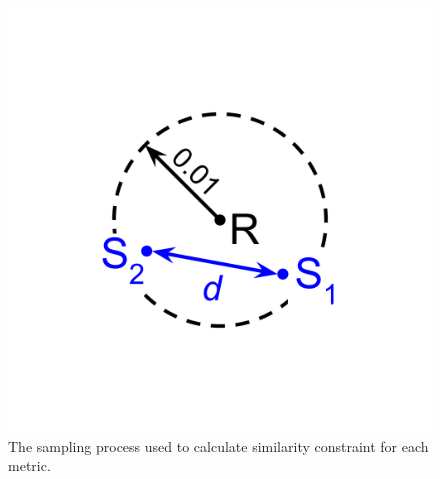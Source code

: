 \begin{figure}[!htbp]
\begin{center}

\begin{minipage}{0.45\linewidth}
\includegraphics[width=\linewidth]{img/dimensionality-statistic}
\end{minipage}
\begin{minipage}{0.45\linewidth}
\caption{
The sampling process used to calculate similarity constraint for each metric.
}
\label{fig:dimensionality_measure}
\end{minipage}
\end{center}
\end{figure}
